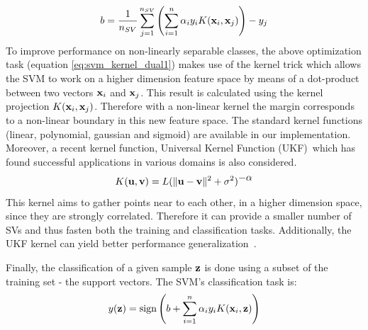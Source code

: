 \documentclass{llncs}
\begin{document}
\begin{align}
b=\frac{1}{n_{SV}}\sum\limits_{j=1}^{n_{SV}} \left( \sum\limits_{i=1}^{n} \alpha_i y_i K({\mathbf x}_i,{\mathbf x}_j) \right) -y_j
\label{fig:svm_b_calculus}
\end{align}
To improve performance on non-linearly separable classes, the above optimization task (equation \ref{eq:svm_kernel_dual1}) makes use of the kernel trick which allows the \ac{SVM} to work on a higher dimension feature space by means of a dot-product between two vectors ${\mathbf x}_i$ and ${\mathbf x}_j$. This result is calculated using the kernel projection $K({\mathbf x}_i,{\mathbf x}_j)$. Therefore with a non-linear kernel the margin corresponds to a non-linear boundary in this new feature space.
The standard kernel functions (linear, polynomial, gaussian and sigmoid) are available in our implementation. Moreover, a recent kernel function, Universal Kernel Function (UKF)~\cite{Rui2011}which has found successful applications in various domains is also considered. %
\begin{equation}
K({\mathbf u},{\mathbf v}) = \displaystyle L (\|{\mathbf u} - {\mathbf v} \|^2 + \sigma^2)\displaystyle^{\displaystyle-\alpha}
\end{equation}
This kernel aims to gather points near to each other, in a higher dimension space, since they are strongly correlated. Therefore it can provide a smaller number of SVs and thus fasten both the training and classification tasks. Additionally, the UKF kernel can yield better performance generalization~\cite{Ayat02kmod}.

Finally, the classification of a given sample ${\mathbf z}$ is done using a subset of the training set - the support vectors. The \ac{SVM}'s classification task is:
\begin{equation} \label{eq:svm_kernel_classfc}
y({\mathbf z})=\text{sign} \left( b + \sum\limits_{i=1}^{n}\alpha_i y_i K({\mathbf x}_i,{\mathbf z})\right)
\end{equation}
\end{document}

